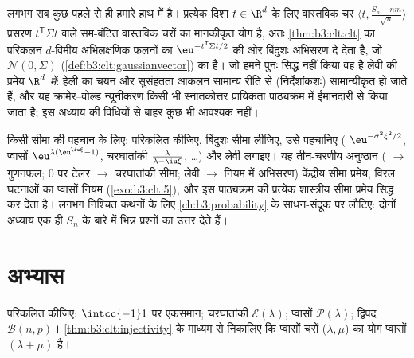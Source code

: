 \begin{remark}\label{rem:b3:clt:multiclt}
लगभग सब कुछ पहले से ही हमारे हाथ में है। प्रत्येक दिशा $t \in \R^d$ के लिए
वास्तविक चर $\langle t,
\frac{S_n - nm}{\sqrt n}\rangle$ प्रसरण $t^{\mathsf T}\Sigma t$ वाले  सम-बंटित वास्तविक चरों
का मानकीकृत योग है, अतः \cref{thm:b3:clt:clt} का परिकलन $d$-विमीय अभिलक्षणिक फलनों
का $\eu^{-t^{\mathsf T}\Sigma t/2}$ की ओर बिंदुशः अभिसरण दे देता है, जो $\mathcal N(0, \Sigma)$ (\cref{def:b3:clt:gaussianvector}) का
 है। जो हमने पुनः सिद्ध नहीं किया वह है लेवी की
 प्रमेय \emph{$\R^d$ में}: हेली का चयन और सुसंहतता आकलन
सामान्य रीति से (निर्देशांकशः) सामान्यीकृत हो जाते हैं, और यह
क्रामेर--वोल्ड न्यूनीकरण किसी भी स्नातकोत्तर प्रायिकता पाठ्यक्रम
में ईमानदारी से किया जाता है; इस अध्याय की विधियों से बाहर कुछ भी
आवश्यक नहीं।
\end{remark}

\begin{method}\label{met:b3:clt:method}
किसी सीमा  की पहचान के लिए:  परिकलित कीजिए,
बिंदुशः सीमा लीजिए, उसे पहचानिए ( $\eu^{-\sigma^2\xi^2/2}$, प्वासों $\eu^{\lambda(\eu^{\iu\xi}-1)}$,
चरघातांकी $\frac{\lambda}
{\lambda - \iu\xi}$, \dots) और लेवी लगाइए। यह तीन-चरणीय अनुष्ठान
( $\to$ गुणनफल; $0$ पर टेलर $\to$ चरघातांकी सीमा; लेवी
$\to$ नियम में अभिसरण) केंद्रीय सीमा प्रमेय, विरल घटनाओं का प्वासों
नियम (\cref{exo:b3:clt:5}), और इस पाठ्यक्रम की प्रत्येक शास्त्रीय सीमा प्रमेय
सिद्ध कर देता है। लगभग निश्चित कथनों के लिए \cref{ch:b3:probability} के साधन-संदूक पर
लौटिए: दोनों अध्याय एक ही $S_n$ के बारे में भिन्न प्रश्नों का उत्तर
देते हैं।
\end{method}

\section{अभ्यास}

\begin{exercise}[$\star$]\label{exo:b3:clt:1}
 परिकलित कीजिए: $\intcc{-1}1$ पर एकसमान; चरघातांकी $\mathcal E(\lambda)$;
प्वासों $\mathcal P(\lambda)$; द्विपद $\mathcal B(n, p)$। \cref{thm:b3:clt:injectivity} के माध्यम से निकालिए कि 
प्वासों चरों ($\lambda, \mu$) का योग प्वासों $(\lambda +
\mu)$ है।
\end{exercise}

